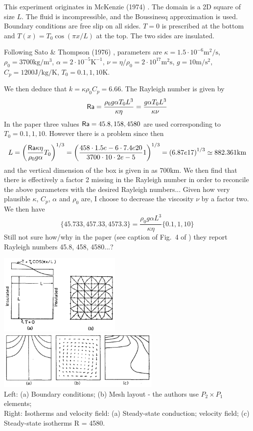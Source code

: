 This experiment originates in McKenzie \etal (1974) \cite{mcrw74}. The domain is a 2D 
square of size $L$. The fluid is incompressible, and the Boussinesq approximation is used.
Boundary conditions are free slip on all sides. $T=0$ is prescribed at the bottom 
and $T(x)=T_0 \cos (\pi x/L)$ at the top. The two sides are insulated.

Following Sato \& Thompson (1976) \cite{sath76}, 
parameters are $\kappa=1.5\cdot 10^{-6}\si{\square\m\per\second}$, 
$\rho_0=3700\si{\kg\per\cubic\metre}$, $\alpha=2\cdot 10^{-5}\si{\kelvin}^{-1}$, 
$\nu=\eta/\rho_0=2\cdot10^{17} \si{\square\metre\second}$, $g=10\si{\metre\per\square\second}$, 
$C_p=1200 \si{\joule\per\kg\per\kelvin}$, $T_0=0.1,1,10\si{\kelvin}$.  

We then deduce that $k=\kappa \rho_0 C_p = 6.66$. The Rayleigh number is given by
\[
{\mathsf{Ra}} 
= \frac{ \rho_0 g \alpha T_0 L^3  }{\kappa \eta}
= \frac{  g \alpha T_0 L^3  }{\kappa \nu}
\]
In the paper three values ${\mathsf{Ra}}=45.8,158,4580$ are used  corresponding to $T_0=0.1,1,10$. 
However there is a problem since then 
\[
L = \left( \frac{{\mathsf{Ra}} \kappa \eta}{\rho_0 g \alpha } T_0   \right)^{1/3}
= \left( \frac{458\cdot 1.5e-6\cdot 7.4e20}{3700\cdot 10\cdot 2e-5 } 1   \right)^{1/3}
= \left( 6.87e17 \right)^{1/3}
\simeq 882.361 \si{\kilo\metre}
\]
and the vertical dimension of the box is given in \cite{mcrw74} as 700\si{\km}. 
We then find that there is effectively a factor 2 missing in the Rayleigh number in order
to reconcile the above parameters with the desired Rayleigh numbers... 
Given how very plausible $\kappa$, $C_p$, $\alpha$ and $\rho_0$ are, I choose to 
decrease the viscosity $\nu$ by a factor two.
We then have 
\[
\{ 45.733, 457.33, 4573.3 \} = \frac{ \rho_0 g \alpha  L^3  }{\kappa \eta} \{ 0.1, 1, 10\}
\]
Still not sure how/why in the paper (see caption of Fig.~4 of \cite{mcrw74}) 
they report Rayleigh numbers 45.8, 458, 4580...?

\begin{center}
\includegraphics[width=6cm]{python_codes/fieldstone_38/images/sath76_a}
\includegraphics[width=8cm]{python_codes/fieldstone_38/images/sath76_b}\\
{\captionfont Left: (a) Boundary conditions; (b) Mesh layout - the authors
use $P_2\times P_1$ elements;\\
Right: Isotherms and velocity field: (a) Steady-state conduction;
velocity field; (c) Steady-state isotherms R = 4580.}
\end{center}

